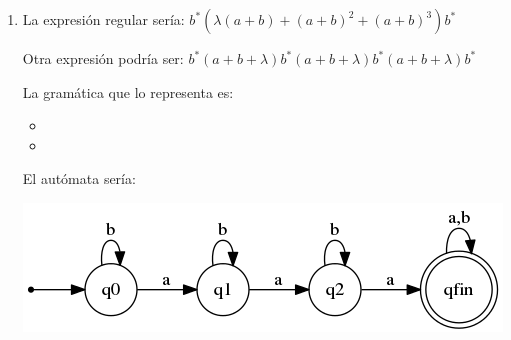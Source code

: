 \begin{problem}
\begin{enumerate}
\item 
La expresión regular sería: $b^* (\lambda (a+b) + (a+b)^2 + (a+b)^3) b^*$

Otra expresión podría ser: $b^*(a+b+\lambda)b^*(a+b+\lambda)b^*(a+b+\lambda) b^*$

La gramática que lo representa es:
\begin{itemize}
\item
\item
\end{itemize}

El autómata sería:
\begin{center}
\includegraphics[scale=0.75]{tex/automata3.png}
\end{center}

\end{enumerate}
\end{problem}

